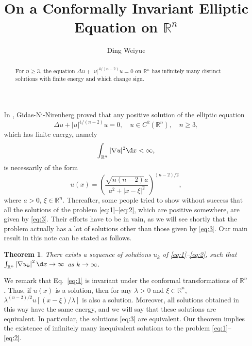 \documentclass[11pt]{article}
\title{On a Conformally Invariant Elliptic Equation on $\mathbb{R}^n$}
\author{Ding Weiyue}
\newtheorem*{theorem}{Theorem}
\begin{document}
\maketitle

\begin{abstract}
  For $n\geq 3$, the equation $\Delta u + |u|^{4/(n-2)}u = 0$
  on $\mathbb{R}^n$ has infinitely many distinct solutions with finite
  energy and which change sign.
\end{abstract}

In \cite{gidas1979symmetry}, Gidas-Ni-Nirenberg proved that any positive solution of the elliptic equation
\begin{equation}\label{eq:1}
  \Delta u+|u|^{4 /(n-2)} u=0, \quad u \in C^2\left(\mathbb{R}^n\right), \quad n \geq 3,
\end{equation}
which has finite energy, namely
\begin{equation}\label{eq:2}
  \int_{\mathbb{R}^n}|\nabla u|^2 \d x<\infty,
\end{equation}
is necessarily of the form
\begin{equation}\label{eq:3}
  u(x)=\left(\frac{\sqrt{n(n-2)} a}{a^2+|x-\xi|^2}\right)^{(n-2)/2},  
\end{equation}
where $a>0$, $\xi \in \mathbb{R}^n$. Thereafter, some people tried to show without success that all the 
solutions of the problem \eqref{eq:1}--\eqref{eq:2}, which are positive somewhere, are given by \eqref{eq:3}.
Their efforts have to be in vain, as we will see shortly that the problem actually has a lot 
of solutions other than those given by \eqref{eq:3}.
Our main result in this note can be stated as follows.


\begin{theorem}
  There exists a sequence of solutions $u_k$ of \eqref{eq:1}--\eqref{eq:2},
  such that $\int_{\mathbb{R}^n}\left|\nabla u_k\right|^2 \d x \rightarrow \infty$
  as $k \rightarrow \infty$.
\end{theorem}

We remark that Eq.~\eqref{eq:1} is invariant under the conformal transformations of $\mathbb{R}^n$.
Thus, if $u(x)$ is a solution, then for any $\lambda>0$ and $\xi \in \mathbb{R}^n$,
$\lambda^{(n-2) / 2} u[(x-\xi) / \lambda]$ is also a solution.
Moreover, all solutions obtained in this way have the same energy,
and we will say that these solutions are equivalent.
In particular, the solutions \eqref{eq:3} are equivalent.
Our theorem implies the existence of infinitely many inequivalent
solutions to the problem \eqref{eq:1}--\eqref{eq:2}.
\end{document}
